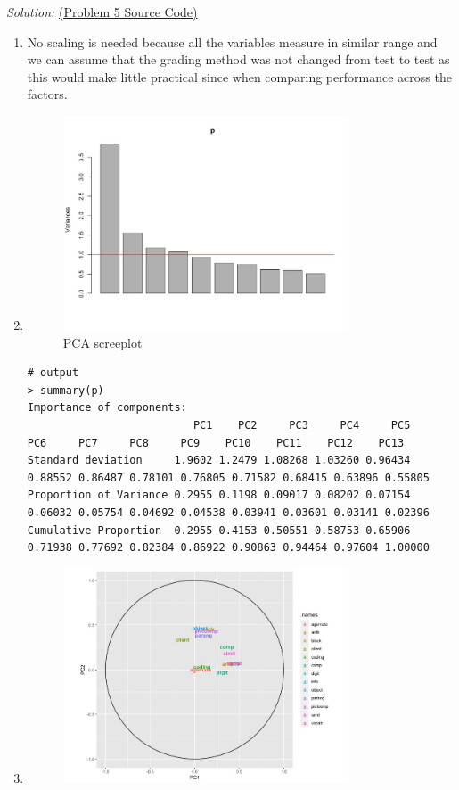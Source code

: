 \documentclass{article}
\newenvironment{solution}
    {\textit{Solution:}}
    {}
\begin{document}
\begin{solution}
\href{run:./src/p5.r}{ (Problem 5 Source Code)}
\begin{enumerate}
\item No scaling is needed because all the variables measure in similar range and we can assume that the grading method was not changed from test to test as this would make little practical since when comparing performance across the factors.
\item\mbox{}
	\begin{figure}[h]\mbox{}
		\centering
		\includegraphics[width=0.8\textwidth]{Rplot_figure5.jpeg}
		\caption{PCA screeplot}
	\end{figure}
	\begin{lstlisting}
# output
> summary(p)
Importance of components:
                          PC1    PC2     PC3     PC4     PC5     PC6     PC7     PC8     PC9    PC10    PC11    PC12    PC13
Standard deviation     1.9602 1.2479 1.08268 1.03260 0.96434 0.88552 0.86487 0.78101 0.76805 0.71582 0.68415 0.63896 0.55805
Proportion of Variance 0.2955 0.1198 0.09017 0.08202 0.07154 0.06032 0.05754 0.04692 0.04538 0.03941 0.03601 0.03141 0.02396
Cumulative Proportion  0.2955 0.4153 0.50551 0.58753 0.65906 0.71938 0.77692 0.82384 0.86922 0.90863 0.94464 0.97604 1.00000
	\end{lstlisting}
\item\mbox{}
	\begin{figure}[h]\mbox{}
		\centering
		\includegraphics[width=0.8\textwidth]{Rplot_figure6.jpeg}

\end{figure}
\end{enumerate}
\end{solution}
\end{document}
